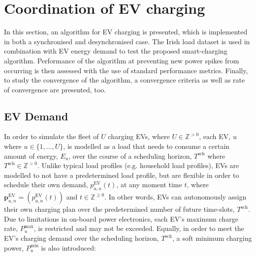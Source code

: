 \section{Coordination of EV charging}
\label{ch3:sec:ev-coordination}

In this section, an algorithm for EV charging is presented, which is implemented in both a synchronised and desynchronised case.
The Irish load dataset \cite{IrishData2002} is used in combination with EV energy demand to test the proposed smart-charging algorithm.
Performance of the algorithm at preventing new power spikes from occurring is then assessed with the use of standard performance metrics.
Finally, to study the convergence of the algorithm, a convergence criteria as well as rate of convergence are presented, too.

\subsection{EV Demand}



In order to simulate the fleet of $U$ charging EVs, where $U \in \mathbb{Z}^{>0}$, each EV, $u$ where $u \in \{1, \dots, U\}$, is modelled as a load that needs to consume a certain amount of energy, $E_u$, over the course of a scheduling horizon, $T^\text{sch}$ where $T^\text{sch} \in \mathbb{Z}^{>0}$.
Unlike typical load profiles (e.g. household load profiles), EVs are modelled to not have a predetermined load profile, but are flexible in order to schedule their own demand, $p^\text{EV}_{u,n}(t)$, at any moment time $t$, where $\textbf{p}^\text{EV}_{u,n} = (p^\text{EV}_{u,n}(t))$ and $t \in \mathbb{Z}^{\geq0}$.
In other words, EVs can autonomously assign their own charging plan over the predetermined number of future time-slots, $T^\text{sch}$.
Due to limitations in on-board power electronics, each EV's maximum charge rate, $P^\text{max}_{u}$, is restricted and may not be exceeded.
Equally, in order to meet the EV's charging demand over the scheduling horizon, $T^\text{sch}$, a soft minimum charging power, $P^\text{min}_{u}$ is also introduced:

